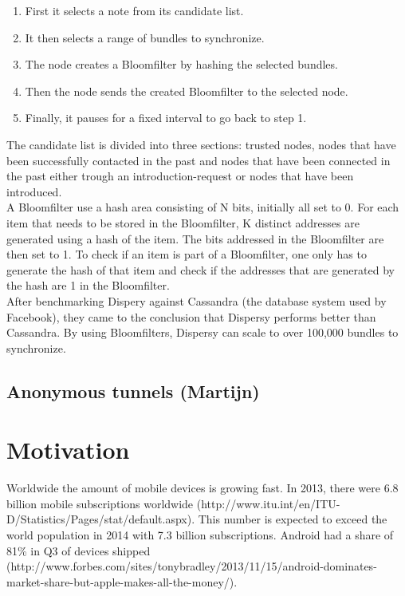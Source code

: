 \documentclass[11pt]{article}
\begin{document}
\begin{enumerate}
\item First it selects a note from its candidate list.
\item It then selects a range of bundles to synchronize.
\item The node creates a Bloomfilter by hashing the selected bundles.
\item Then the node sends the created Bloomfilter to the selected node.
\item Finally, it pauses for a fixed interval to go back to step 1.
\end{enumerate}

The candidate list is divided into three sections: trusted nodes, nodes that have been successfully contacted in the past and nodes that have been connected in the past either trough an introduction-request or nodes that have been introduced.\\

A Bloomfilter use a hash area consisting of N bits, initially all set to 0. For each item that needs to be stored in the Bloomfilter, K distinct addresses are generated using a hash of the item. The bits addressed in the Bloomfilter are then set to 1. To check if an item is part of a Bloomfilter, one only has to generate the hash of that item and check if the addresses that are generated by the hash are 1 in the Bloomfilter.\\

After benchmarking Dispery against Cassandra (the database system used by Facebook), they came to the conclusion that Dispersy performs better than Cassandra. By using Bloomfilters, Dispersy can scale to over 100,000 bundles to synchronize.


\subsection{Anonymous tunnels (Martijn)}

\section{Motivation}
Worldwide the amount of mobile devices is growing fast. In 2013, there were 6.8 billion mobile subscriptions worldwide (http://www.itu.int/en/ITU-D/Statistics/Pages/stat/default.aspx). This number is expected to exceed the world population in 2014 with 7.3 billion subscriptions. Android had a share of 81\% in Q3 of devices shipped (http://www.forbes.com/sites/tonybradley/2013/11/15/android-dominates-market-share-but-apple-makes-all-the-money/).
\end{document}
